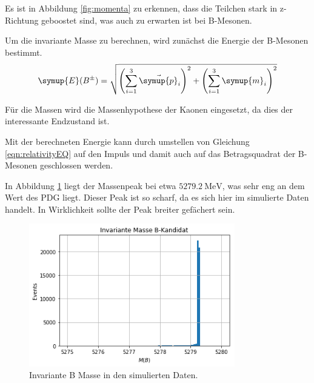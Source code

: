 Es ist in Abbildung \ref{fig:momenta} zu erkennen, dass die Teilchen stark in z-Richtung geboostet sind, was auch zu erwarten ist bei B-Mesonen.

Um die invariante Masse zu berechnen, wird zun\"achst die Energie der B-Mesonen bestimmt.
\begin{equation}
  \symup{E}(B^{\pm}) =
  \sqrt{\left(\sum_{i = 1}^{3} \vec{\symup{p}}_i\right)^2 + \left(\sum_{i = 1}^{3} \symup{m}_i\right)^2}
\end{equation}

F\"ur die Massen wird die Massenhypothese der Kaonen eingesetzt, da dies der interessante Endzustand ist.

Mit der berechneten Energie kann durch umstellen von Gleichung \eqref{eqn:relativityEQ} auf den Impuls und damit auch auf das Betragsquadrat der B-Mesonen geschlossen werden.

In Abbildung \ref{fig:invMassB} liegt der Massenpeak bei etwa $\SI{5279.2}{\mega\electronvolt}$, was sehr eng an dem Wert des PDG liegt.
Dieser Peak ist so scharf, da es sich hier im simulierte Daten handelt. In Wirklichkeit sollte der Peak breiter gefächert sein.

\begin{figure}[!htb]
  \centering
  \includegraphics[width=0.8\textwidth]{plots/sim_inv_masse_B.png}
  \caption{Invariante B Masse in den simulierten Daten.}
  \label{fig:invMassB}
\end{figure}

